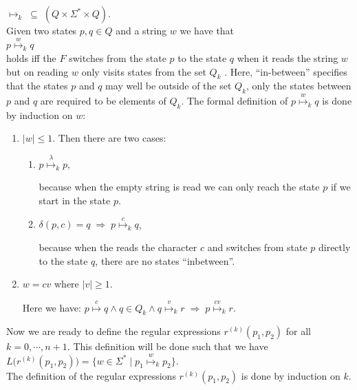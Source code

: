 \hspace*{1.3cm}
$\mapsto_k \;\subseteq\; (Q \times \Sigma^* \times Q)$.
\\[0.2cm]
Given two states $p, q \in Q$ and a string $w$ we have that
\\[0.2cm]
\hspace*{1.3cm}
$p \stackrel{w}{\mapsto}_k q$
\\[0.2cm]
holds iff the  $F$ switches from the state $p$ to the state $q$ when it reads the string $w$
but on reading $w$ only visits states from the set
$Q_k$ .  Here, ``in-between'' specifies that the states $p$ and $q$ may well be outside of the set
$Q_k$, only the states between $p$ and $q$ are required to be elements of $Q_k$.
The formal definition of $p \stackrel{w}{\mapsto}_k q$ is done by induction on  $w$:
\begin{enumerate}
\item[B.C.:] $|w| \leq 1$.  Then there are two cases:
  \begin{enumerate}
  \item $p \stackrel{\lambda}{\mapsto}_k p$,

        because when the empty string is read we can only reach the state $p$ if we start in the state $p$.
  \item $\delta(p, c) = q \;\Rightarrow\; p \stackrel{c}{\mapsto}_k q$,

        because when the  reads the character $c$ and switches from state $p$ directly
        to the state $q$, there are no states ``inbetween''.
  \end{enumerate}
\item[I.S.:] $w = cv$ where $|v| \geq 1$.

             Here we have:
             \hspace*{1.3cm}
            $p \stackrel{c}{\mapsto} q \wedge q \in Q_k \wedge q \stackrel{v}{\mapsto}_k r
              \;\Rightarrow\; p \stackrel{cv}{\mapsto}_k r$.
\end{enumerate}
Now we are ready to define the regular expressions $r^{(k)}(p_1, p_2)$ for all $k=0,\cdots,n+1$.
This definition will be done such that we have
\\[0.2cm]
\hspace*{1.3cm}
$L\bigl(r^{(k)}(p_1, p_2)\bigr) = \bigl\{ w \in \Sigma^* \mid p_1 \stackrel{w}{\mapsto}_k p_2 \bigr\}$.
\\[0.2cm]
The definition of the regular expressions $r^{(k)}(p_1, p_2)$ is done by induction on $k$.

